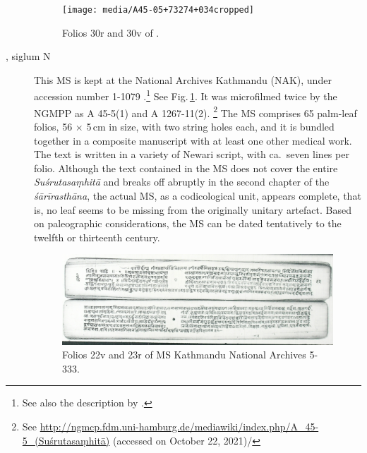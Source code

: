 \begin{description}
    
    
    \begin{figure}[t]
        \centering
        \texttt{[image: media/A45-05+73274+034cropped]}
        \caption{Folios 30r and 30v of .}
        \label{fig:a45-0573274044}
    \end{figure}
    
    \item[\MS{Kathmandu NAK 1-1079}, siglum N] This MS is kept at the National
    Archives Kathmandu (NAK), under accession number 1-1079 .\footnote{See also 
    the description by \cite[\S 2.2]{kleb-2021b}.} See
    Fig.\,\ref{fig:a45-0573274044}. It was microfilmed twice by the NGMPP as A
    45-5(1) and A 1267-11(2).%
    \footnote{%
    See 
    \url{http://ngmcp.fdm.uni-hamburg.de/mediawiki/index.php/A_45-5_(Suśrutasaṃhitā)} 
    (accessed on October 22, 2021)/ } The MS comprises 65 palm-leaf folios, 56 $\times$ 
    5\,cm in size, with two string holes each, and it is bundled together in a composite 
    manuscript with at least one other medical work. The text is written in a variety of 
    Newari script, with ca.\ seven lines per folio. Although the text contained in the MS 
    does not cover the entire \emph{Suśrutasaṃhitā} and breaks off abruptly in the 
    second chapter of the \emph{śārīrasthāna}, the actual MS, as a codicological unit, 
    appears complete, that is, no leaf seems to be missing from the originally unitary 
    artefact. Based on paleographic considerations, the MS can be dated tentatively to 
    the twelfth or thirteenth century.
    
    \begin{figure}[t]
        \centering
        \includegraphics[draft=false,width=1\linewidth]{"media/dscn2998 fol 022cropped"}
        \caption{Folios 22v and 23r of MS Kathmandu National Archives 5-333.}
        \label{fig:dscn2998-fol-022cropped}
    \end{figure}
    

\end{description}
